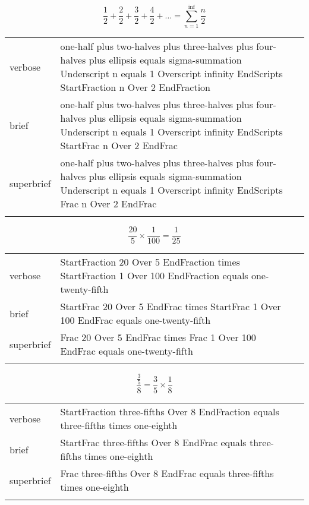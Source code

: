 \R
\E \[\frac{1}{2}+\frac{2}{2}+\frac{3}{2}+\frac{4}{2}+\ldots = \sum_{n=1}^{\inf}\frac{n}{2}\]
\begin{longtable}[c]{@{}lll@{}}
\toprule\addlinespace
verbose & one-half plus two-halves plus three-halves plus four-halves
plus ellipsis equals sigma-summation Underscript n equals 1 Overscript
infinity EndScripts StartFraction n Over 2 EndFraction &

\\\addlinespace
brief & one-half plus two-halves plus three-halves plus four-halves plus
ellipsis equals sigma-summation Underscript n equals 1 Overscript
infinity EndScripts StartFrac n Over 2 EndFrac &

\\\addlinespace
superbrief & one-half plus two-halves plus three-halves plus four-halves
plus ellipsis equals sigma-summation Underscript n equals 1 Overscript
infinity EndScripts Frac n Over 2 EndFrac &

\\\addlinespace
\bottomrule
\end{longtable}


\E \[\frac{20}{5}\times \frac{1}{100}=\frac{1}{25}\]
\begin{longtable}[c]{@{}lll@{}}
\toprule\addlinespace
verbose & StartFraction 20 Over 5 EndFraction times StartFraction 1 Over
100 EndFraction equals one-twenty-fifth &

\\\addlinespace
brief & StartFrac 20 Over 5 EndFrac times StartFrac 1 Over 100 EndFrac
equals one-twenty-fifth &

\\\addlinespace
superbrief & Frac 20 Over 5 EndFrac times Frac 1 Over 100 EndFrac equals
one-twenty-fifth &

\\\addlinespace
\bottomrule
\end{longtable}


\E \[\frac{\frac{3}{5}}{8} = \frac{3}{5}\times \frac{1}{8}\]
\begin{longtable}[c]{@{}lll@{}}
\toprule\addlinespace
verbose & StartFraction three-fifths Over 8 EndFraction equals
three-fifths times one-eighth &

\\\addlinespace
brief & StartFrac three-fifths Over 8 EndFrac equals three-fifths times
one-eighth &

\\\addlinespace
superbrief & Frac three-fifths Over 8 EndFrac equals three-fifths times
one-eighth &

\\\addlinespace
\bottomrule
\end{longtable}


